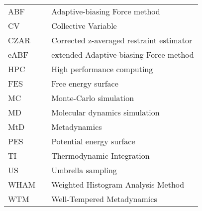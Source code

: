 \label{cha:symbols}

\begin{longtable}[l]{lcp{10cm}}
	ABF		&&  Adaptive-biasing Force method \\
	CV    &&  Collective Variable \\
	CZAR  &&  Corrected z-averaged restraint estimator \\
	eABF  &&  extended Adaptive-biasing Force method \\
	HPC   &&  High performance computing \\
	FES   &&  Free energy surface \\
	MC    &&  Monte-Carlo simulation \\
	MD    &&  Molecular dynamics simulation \\
	MtD   &&  Metadynamics \\
	PES   &&  Potential energy surface \\
	TI    &&  Thermodynamic Integration \\
  US    &&  Umbrella sampling \\
	WHAM  && Weighted Histogram Analysis Method \\
	WTM   &&  Well-Tempered Metadynamics \\
\end{longtable}
